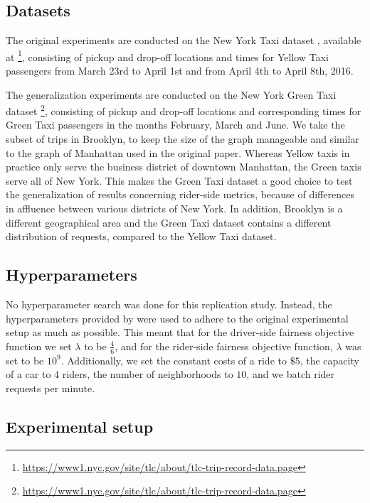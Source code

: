 \subsection{Datasets}

The original experiments are conducted on the New York Taxi dataset \cite{nyc}, available at \footnote{\url{https://www1.nyc.gov/site/tlc/about/tlc-trip-record-data.page}}, consisting of pickup and drop-off locations and times for Yellow Taxi passengers from March 23rd to April 1st and from April 4th to April 8th, 2016.

The generalization experiments are conducted on the New York Green Taxi dataset \footnote{\url{https://www1.nyc.gov/site/tlc/about/tlc-trip-record-data.page}}, consisting of pickup and drop-off locations and corresponding times for Green Taxi passengers in the months February, March and June. We take the subset of trips in Brooklyn, to keep the size of the graph manageable and similar to the graph of Manhattan used in the original paper. Whereas Yellow taxis in practice only serve the business district of downtown Manhattan, the Green taxis serve all of New York. This makes the Green Taxi dataset a good choice to test the generalization of results concerning rider-side metrics, because of differences in affluence between various districts of New York. In addition, Brooklyn is a different geographical area and the Green Taxi dataset contains a different distribution of requests, compared to the Yellow Taxi dataset.


\subsection{Hyperparameters}

No hyperparameter search was done for this replication study. Instead, the hyperparameters provided by \cite{raman_data-driven_2021} were used to adhere to the original experimental setup as much as possible. This meant that for the driver-side fairness objective function we set $\lambda$ to be $\frac{4}{6}$, and for the rider-side fairness objective function, $\lambda$ was set to be $10^9$. Additionally, we set the constant costs of a ride to $\$5$, the capacity of a car to $4$ riders, the number of neighborhoods to $10$, and we batch rider requests per minute.

\subsection{Experimental setup}

